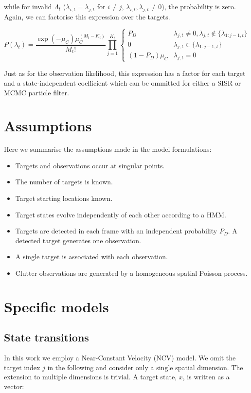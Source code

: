 while for invalid $\Lambda_t$ ($\lambda_{i,t}=\lambda_{j,t}$ for $i \ne j$, $\lambda_{i,t},\lambda_{j,t} \ne 0$), the probability is zero. Again, we can factorise this expression over the targets.

\begin{equation}
P(\lambda_t) = \frac{\exp(-\mu_C) \mu_C^{(M_t-K_t)}}{M_t!} \prod_{j=1}^{K_t} \begin{cases} P_D & \lambda_{j,t} \ne 0, \lambda_{j,t} \notin \{ \lambda_{1:j-1,t} \} \\ 0 & \lambda_{j,t} \in \{ \lambda_{1:j-1,t} \} \\ (1-P_D) \mu_C & \lambda_{j,t}=0 \end{cases}
\label{eq:MTFactorisedAssociationLikelihood}
\end{equation}

Just as for the observation likelihood, this expression has a factor for each target and a state-independent coefficient which can be ommitted for either a SISR or MCMC particle filter.



\section{Assumptions}
Here we summarise the assumptions made in the model formulations:

\begin{itemize}
	\item Targets and observations occur at singular points.
	\item The number of targets is known.
	\item Target starting locations known.
	\item Target states evolve independently of each other according to a HMM.
	\item Targets are detected in each frame with an independent probability $P_D$. A detected target generates one observation.
	\item A single target is associated with each observation.
	\item Clutter observations are generated by a homogeneous spatial Poisson process.
\end{itemize}



\section{Specific models}

\subsection{State transitions}
In this work we employ a Near-Constant Velocity (NCV) model. We omit the target index $j$ in the following and consider only a single spatial dimension. The extension to multiple dimensions is trivial. A target state, $x$, is written as a vector:

